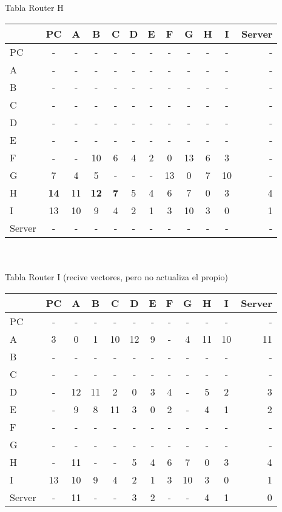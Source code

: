 \documentclass{article}
\begin{document}
\\
\\
Tabla Router H \\
\begin{tabular}{l*{10}{c}r}
              & PC & A & B & C & D & E & F & G & H & I & Server \\
\hline
PC             & - & - & - & - & - & - & - & - & - & - & - \\
A              & - & - & - & - & - & - & - & - & - & - & - \\
B              & - & - & - & - & - & - & - & - & - & - & - \\
C              & - & - & - & - & - & - & - & - & - & - & - \\
D              & - & - & - & - & - & - & - & - & - & - & - \\
E              & - & - & - & - & - & - & - & - & - & - & - \\
F              & - & - & 10 & 6 & 4 & 2 & 0 & 13 & 6 & 3 & -\\
G              & 7 & 4 & 5 & - & - & - & 13 & 0 & 7 & 10 & -\\
H              &\bf{14}& 11 &\bf{12}&\bf{7}& 5 & 4 & 6 & 7 & 0 & 3 & 4\\
I              & 13 & 10 & 9 & 4 & 2 & 1 & 3 & 10 & 3 & 0 & 1\\
Server         & - & - & - & - & - & - & - & - & - & - & - \\

\end{tabular}
\\
\\
Tabla Router I (recive vectores, pero no actualiza el propio)\\
\begin{tabular}{l*{10}{c}r}
              & PC & A & B & C & D & E & F & G & H & I & Server \\
\hline
PC             & - & - & - & - & - & - & - & - & - & - & -\\
A              & 3 & 0 & 1 & 10 & 12 & 9 & - & 4 & 11 & 10 & 11 \\
B              & - & - & - & - & - & - & - & - & - & - & -\\
C              & - & - & - & - & - & - & - & - & - & - & -\\
D              & - & 12 & 11 & 2 & 0 & 3 & 4 & - & 5 & 2 & 3\\
E              & - & 9 & 8 & 11 & 3 & 0 & 2 & - & 4 & 1 & 2\\
F              & - & - & - & - & - & - & - & - & - & - & -\\
G              & - & - & - & - & - & - & - & - & - & - & -\\
H              & - & 11 & - & - & 5 & 4 & 6 & 7 & 0 & 3 & 4\\
I              & 13 & 10 & 9 & 4 & 2 & 1 & 3 & 10 & 3 & 0 & 1\\
Server         & - & 11 & - & - & 3 & 2 & - & - & 4 & 1 & 0\\

\end{tabular}
\end{document}
